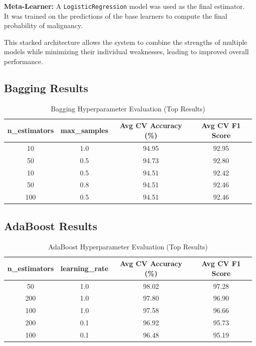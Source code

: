 \documentclass[11pt]{article}
\begin{document}
\textbf{Meta-Learner:} A \texttt{LogisticRegression} model was used as the final estimator. It was trained on the predictions of the base learners to compute the final probability of malignancy.

This stacked architecture allows the system to combine the strengths of multiple models while minimizing their individual weaknesses, leading to improved overall performance.





\subsection{Bagging Results}

\begin{table}[H]
\centering
\caption{Bagging Hyperparameter Evaluation (Top Results)}
\begin{tabular}{cccc}
\toprule
n\_estimators & max\_samples & Avg CV Accuracy (\%) & Avg CV F1 Score \\
\midrule
10  & 1.0 & 94.95 & 92.95 \\
50  & 0.5 & 94.73 & 92.80 \\
10  & 0.5 & 94.51 & 92.42 \\
50  & 0.8 & 94.51 & 92.46 \\
100 & 0.5 & 94.51 & 92.46 \\
\bottomrule
\end{tabular}
\end{table}

\subsection{AdaBoost Results}

\begin{table}[H]
\centering
\caption{AdaBoost Hyperparameter Evaluation (Top Results)}
\begin{tabular}{cccc}
\toprule
n\_estimators & learning\_rate & Avg CV Accuracy (\%) & Avg CV F1 Score \\
\midrule
50  & 1.0 & 98.02 & 97.28 \\
200 & 1.0 & 97.80 & 96.90 \\
100 & 1.0 & 97.58 & 96.66 \\
200 & 0.1 & 96.92 & 95.73 \\
100 & 0.1 & 96.48 & 95.19 \\
\bottomrule
\end{tabular}
\end{table}
\end{document}
